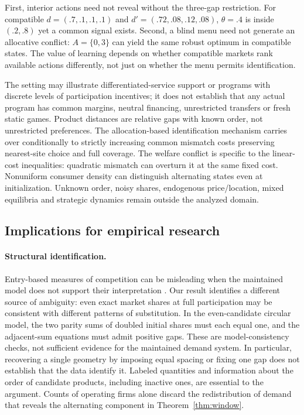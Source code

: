 \documentclass[11pt]{article}
\begin{document}
First, interior actions need not reveal without the three-gap restriction. For compatible $d=(.7,.1,.1,.1)$ and $d'=(.72,.08,.12,.08)$, $\theta=.4$ is inside $(.2,.8)$ yet a common signal exists. Second, a blind menu need not generate an allocative conflict: $A=\{0,3\}$ can yield the same robust optimum in compatible states. The value of learning depends on whether compatible markets rank available actions differently, not just on whether the menu permits identification.

The setting may illustrate differentiated-service support or programs with discrete levels of participation incentives; it does not establish that any actual program has common margins, neutral financing, unrestricted transfers or fresh static games. Product distances are relative gaps with known order, not unrestricted preferences. The allocation-based identification mechanism carries over conditionally to strictly increasing common mismatch costs preserving nearest-site choice and full coverage. The welfare conflict is specific to the linear-cost inequalities: quadratic mismatch can overturn it at the same fixed cost. Nonuniform consumer density can distinguish alternating states even at initialization. Unknown order, noisy shares, endogenous price/location, mixed equilibria and strategic dynamics remain outside the analyzed domain.

\subsection{Implications for empirical research}\label{sec:empirical}

\paragraph{Structural identification.} Entry-based measures of competition can be misleading when the maintained model does not support their interpretation \citep{kesternich2020}. Our result identifies a different source of ambiguity: even exact market shares at full participation may be consistent with different patterns of substitution. In the even-candidate circular model, the two parity sums of doubled initial shares must each equal one, and the adjacent-sum equations must admit positive gaps. These are model-consistency checks, not sufficient evidence for the maintained demand system. In particular, recovering a single geometry by imposing equal spacing or fixing one gap does not establish that the data identify it. Labeled quantities and information about the order of candidate products, including inactive ones, are essential to the argument. Counts of operating firms alone discard the redistribution of demand that reveals the alternating component in Theorem~\ref{thm:window}.
\end{document}
